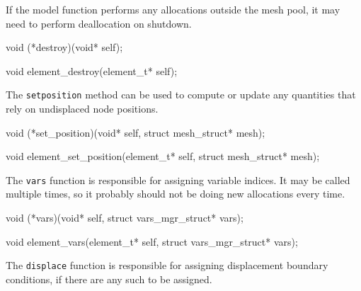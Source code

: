 If the model function performs any allocations outside the mesh
pool, it may need to perform deallocation on shutdown.

\nwenddocs{}\plusendmoddef
void (*destroy)(void* self);
\nwendcode{}\nwdocspar

\nwenddocs{}\plusendmoddef
void element_destroy(element_t* self);
\nwendcode{}\nwdocspar

The {\tt{}set{}position} method can be used to compute or update any 
quantities that rely on undisplaced node positions.

\nwenddocs{}\plusendmoddef
void (*set_position)(void* self, struct mesh_struct* mesh);
\nwendcode{}\nwdocspar

\nwenddocs{}\plusendmoddef
void element_set_position(element_t* self, struct mesh_struct* mesh);
\nwendcode{}\nwdocspar

The {\tt{}vars} function is responsible for assigning variable indices.
It may be called multiple times, so it probably should not be doing
new allocations every time.

\nwenddocs{}\plusendmoddef
void (*vars)(void* self, struct vars_mgr_struct* vars);
\nwendcode{}\nwdocspar

\nwenddocs{}\plusendmoddef
void element_vars(element_t* self, struct vars_mgr_struct* vars);
\nwendcode{}\nwdocspar


The {\tt{}displace} function is responsible for assigning displacement
boundary conditions, if there are any such to be assigned.

